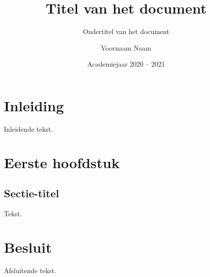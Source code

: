 \documentclass[twoside, kulak]{kulakreport} %
\title{Titel van het document}
\subtitle{Ondertitel van het document}
\author{Voornaam Naam}
\date{Academiejaar 2020 -- 2021}
\institute{Naam van de opleiding}
\begin{document}
\titlepage

\tableofcontents

\chapter*{Inleiding}
Inleidende tekst.

\chapter{Eerste hoofdstuk}
\section{Sectie-titel}
Tekst.

\chapter*{Besluit}
Afsluitende tekst.
\end{document}
